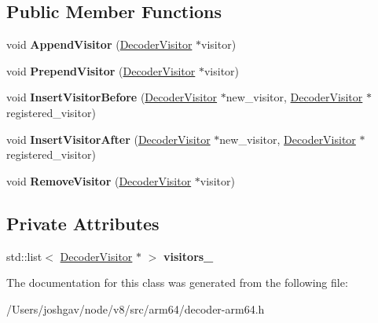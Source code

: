 \subsection*{Public Member Functions}
\begin{DoxyCompactItemize}
\item 
void {\bfseries Append\+Visitor} (\hyperlink{classv8_1_1internal_1_1_decoder_visitor}{Decoder\+Visitor} $\ast$visitor)\hypertarget{classv8_1_1internal_1_1_dispatching_decoder_visitor_a2cc18d6c2d3dca656181b68eb092ee9d}{}\label{classv8_1_1internal_1_1_dispatching_decoder_visitor_a2cc18d6c2d3dca656181b68eb092ee9d}

\item 
void {\bfseries Prepend\+Visitor} (\hyperlink{classv8_1_1internal_1_1_decoder_visitor}{Decoder\+Visitor} $\ast$visitor)\hypertarget{classv8_1_1internal_1_1_dispatching_decoder_visitor_a9bde00a60970d0d420b3ba8fe2e6ea26}{}\label{classv8_1_1internal_1_1_dispatching_decoder_visitor_a9bde00a60970d0d420b3ba8fe2e6ea26}

\item 
void {\bfseries Insert\+Visitor\+Before} (\hyperlink{classv8_1_1internal_1_1_decoder_visitor}{Decoder\+Visitor} $\ast$new\+\_\+visitor, \hyperlink{classv8_1_1internal_1_1_decoder_visitor}{Decoder\+Visitor} $\ast$registered\+\_\+visitor)\hypertarget{classv8_1_1internal_1_1_dispatching_decoder_visitor_a11f1b7b5caa21fe5087601997b800f25}{}\label{classv8_1_1internal_1_1_dispatching_decoder_visitor_a11f1b7b5caa21fe5087601997b800f25}

\item 
void {\bfseries Insert\+Visitor\+After} (\hyperlink{classv8_1_1internal_1_1_decoder_visitor}{Decoder\+Visitor} $\ast$new\+\_\+visitor, \hyperlink{classv8_1_1internal_1_1_decoder_visitor}{Decoder\+Visitor} $\ast$registered\+\_\+visitor)\hypertarget{classv8_1_1internal_1_1_dispatching_decoder_visitor_a4c61ff92560304b911a7f188921cd99c}{}\label{classv8_1_1internal_1_1_dispatching_decoder_visitor_a4c61ff92560304b911a7f188921cd99c}

\item 
void {\bfseries Remove\+Visitor} (\hyperlink{classv8_1_1internal_1_1_decoder_visitor}{Decoder\+Visitor} $\ast$visitor)\hypertarget{classv8_1_1internal_1_1_dispatching_decoder_visitor_afb3200eb3db0b8b11b24a752eee5f03c}{}\label{classv8_1_1internal_1_1_dispatching_decoder_visitor_afb3200eb3db0b8b11b24a752eee5f03c}

\end{DoxyCompactItemize}
\subsection*{Private Attributes}
\begin{DoxyCompactItemize}
\item 
std\+::list$<$ \hyperlink{classv8_1_1internal_1_1_decoder_visitor}{Decoder\+Visitor} $\ast$ $>$ {\bfseries visitors\+\_\+}\hypertarget{classv8_1_1internal_1_1_dispatching_decoder_visitor_a423519f27b7476090717a8d4b2adc9f8}{}\label{classv8_1_1internal_1_1_dispatching_decoder_visitor_a423519f27b7476090717a8d4b2adc9f8}

\end{DoxyCompactItemize}


The documentation for this class was generated from the following file\+:\begin{DoxyCompactItemize}
\item 
/\+Users/joshgav/node/v8/src/arm64/decoder-\/arm64.\+h\end{DoxyCompactItemize}
